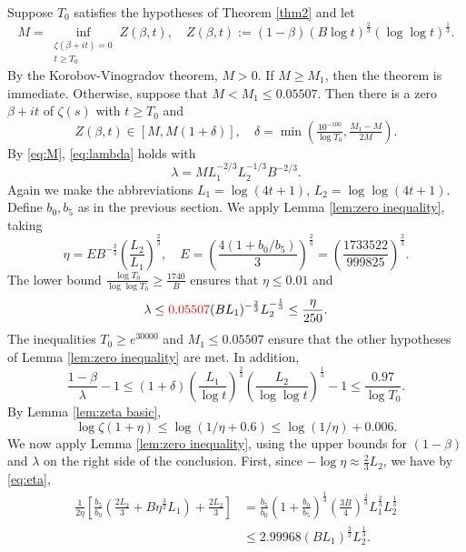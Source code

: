 \documentclass[10pt]{amsart}
\theoremstyle{remark}
\theoremstyle{plain}
\numberwithin{equation}{section}
\theoremstyle{definition}
\def\({\left(}
\def\){\right)}
\def\pfrac#1#2{\left(\frac{#1}{#2}\right)}
\def\lam{\lambda}
\newcommand{\be}{\begin{equation}}
\newcommand{\rev}[1]{{\color{red}#1}}
\begin{document}
Suppose $T_0$ satisfies the hypotheses of Theorem \ref{thm2} and let 
\begin{equation}
M = \inf_{\substack{\zeta(\beta+it)=0 \\ t\ge T_0}} Z(\beta,t), \quad
Z(\beta,t) := (1-\beta) (B\log t)^{\frac23} (\log\log t)^{\frac13}. 
\label{eq:M}
\end{equation}
By the Korobov-Vinogradov theorem, $M>0$.
If $M \ge M_1$, then the theorem is immediate.  Otherwise,
suppose that $M < M_1 \le 0.05507$.  Then there is a zero $\beta+it$
of $\zeta(s)$ with $t\ge T_0$ and
$$
Z(\beta,t) \in [M,M(1+\delta)], \quad
\delta=\min\(\tfrac{10^{-100}}{\log T_0}, \tfrac{M_1-M}{2M} \).
$$
By \eqref{eq:M}, \eqref{eq:lambda} holds with
\begin{equation}
\lam = M L_1^{-2/3} L_2^{-1/3} B^{-2/3}. 
\label{eq:lambda 2}
\end{equation}
Again we make the abbreviations $L_1=\log(4t+1)$, $L_2=\log\log(4t+1)$.
Define $b_0,b_5$ as in the previous section.  We
apply Lemma \ref{lem:zero inequality}, taking
\begin{equation}
\eta = E B^{-\frac23} \pfrac{L_2}{L_1}^{\frac23}, \quad 
E = \pfrac{4(1+b_0/b_5)}{3}^{\frac23} = \pfrac{1733522}{999825}^{\frac23}. 
\label{eq:eta}
\end{equation}
The lower bound $\frac{\log T_0}{\log\log T_0} \ge \frac{1740}{B}$ ensures
that $\eta \le 0.01$ and 
$$
\lam \le \rev{0.05507} (BL_1)^{-\frac23}L_2^{-\frac13} \le \frac{\eta}{250}.
$$
The inequalities $T_0 \ge e^{30000}$ and
$M_1 \le 0.05507$ ensure that the other hypotheses of Lemma 
\ref{lem:zero inequality} are met.
In addition,
\begin{equation}
\frac{1-\beta}{\lam}-1 \le (1+\delta)\pfrac{L_1}{\log t}^{\frac23} \pfrac{L_2}
{\log\log t}^{\frac13}-1 \le \frac{0.97}{\log T_0}.
\label{eq:1-beta lower}
\end{equation}
By Lemma \ref{lem:zeta basic},
\be
\log \zeta(1+\eta) \le \log(1/\eta+0.6) \le \log(1/\eta)+0.006.
\label{eq:log(1+eta)}
\end{equation}
We now apply Lemma \ref{lem:zero inequality},
 using the upper bounds for $(1-\beta)$ and
$\lam$ on the right side of the conclusion.
First, since $-\log\eta \approx \frac23 L_2$,
we have by \eqref{eq:eta},
\begin{equation}
\begin{split}
\frac{1}{2\eta} \left[ \frac{b_5}{b_0} \( \!\frac{2L_2}{3}+B\eta^{\frac32}
  L_1\!\) +\frac{2L_2}{3} \right] &= \frac{b_5}{b_0}\(1+\frac{b_0}{b_5}
  \)^{\frac13} \pfrac{3B}{4}^{\frac23} L_1^{\frac23} L_2^{\frac13} \\
&\le 2.99968 (BL_1)^{\frac23} L_2^{\frac13}.
\end{split}
\label{eq:main term}
\end{equation}
\end{document}
